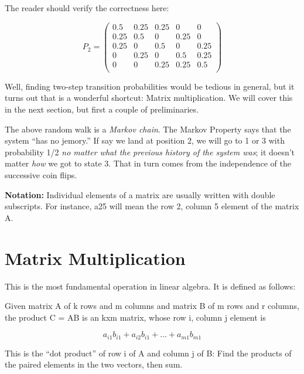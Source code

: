 \documentclass[
  letterpaper,
  DIV=11,
  numbers=noendperiod,
  oneside]{scrreprt}
\begin{document}
The reader should verify the correctness here:

\[
P_2 =
\left (
\begin{array}{rrrrr}
0.5 & 0.25 & 0.25 & 0 & 0\\
0.25 & 0.5 & 0 & 0.25 & 0\\
0.25 & 0 & 0.5 & 0 & 0.25\\
0 & 0.25 & 0 & 0.5 & 0.25\\
0 & 0 & 0.25 & 0.25 & 0.5 \\
\end{array}
\right )
\]

Well, finding two-step transition probabilities would be tedious in
general, but it turns out that is a wonderful shortcut: Matrix
multiplication. We will cover this in the next section, but first a
couple of preliminaries.

The above random walk is a \emph{Markov chain}. The Markov Property says
that the system ``has no jemory.'' If say we land at position 2, we will
go to 1 or 3 with probability 1/2 \emph{no matter what the previous
history of the system was}; it doesn't matter \emph{how} we got to state
3. That in turn comes from the independence of the successive coin
flips.

\textbf{Notation:} Individual elements of a matrix are usually written
with double subscripts. For instance, a25 will mean the row 2, column 5
element of the matrix A.

\hypertarget{matrix-multiplication-1}{%
\section{Matrix Multiplication}\label{matrix-multiplication-1}}

This is the most fundamental operation in linear algebra. It is defined
as follows:

Given matrix A of k rows and m columns and matrix B of m rows and r
columns, the product C = AB is an kxm matrix, whose row i, column j
element is

\[
a_{i1} b_{i1} +
a_{i2} b_{i1} + ... +
a_{m1} b_{m1} 
\]

This is the ``dot product'' of row i of A and column j of B: Find the
products of the paired elements in the two vectors, then sum.

{}
\end{document}
